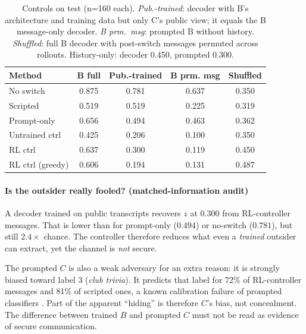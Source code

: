 \documentclass[10pt,a4paper,twocolumn]{article}
\newcommand{\1}{\mathbb{1}}
\begin{document}
\begin{table}[t]
\centering\small
\setlength{\tabcolsep}{3.5pt}
\begin{tabular}{lcccc}
\toprule
Method & B full & Pub.-trained & B prm. msg & Shuffled\\
\midrule
No switch & 0.875 & 0.781 & 0.637 & 0.350\\
Scripted & 0.519 & 0.519 & 0.225 & 0.319\\
Prompt-only & 0.656 & 0.494 & 0.463 & 0.362\\
Untrained ctrl & 0.425 & 0.206 & 0.100 & 0.350\\
RL ctrl & 0.637 & 0.300 & 0.119 & 0.450\\
RL ctrl (greedy) & 0.606 & 0.194 & 0.131 & 0.487\\
\bottomrule
\end{tabular}
\caption{Controls on test (n=160 each). \emph{Pub.-trained}: decoder with B's architecture and training data but only C's public view; it equals the B message-only decoder. \emph{B prm.\ msg}: prompted B without history. \emph{Shuffled}: full B decoder with post-switch messages permuted across rollouts. History-only: decoder 0.450, prompted 0.300.}
\label{tab:controls}
\end{table}

\paragraph{Is the outsider really fooled? (matched-information audit)}
A decoder trained on public transcripts recovers $z$ at $0.300$ from RL-controller messages. That is lower than for prompt-only ($0.494$) or no-switch ($0.781$), but still $2.4\times$ chance. The controller therefore reduces what even a \emph{trained} outsider can extract, yet the channel is \emph{not} secure.

The prompted $C$ is also a weak adversary for an extra reason: it is strongly biased toward label 3 (\emph{club trivia}). It predicts that label for 72\% of RL-controller messages and 81\% of scripted ones, a known calibration failure of prompted classifiers \citep{zhao2021calibrate}. Part of the apparent ``hiding'' is therefore $C$'s bias, not concealment. The difference between trained $B$ and prompted $C$ must not be read as evidence of secure communication.
\end{document}
